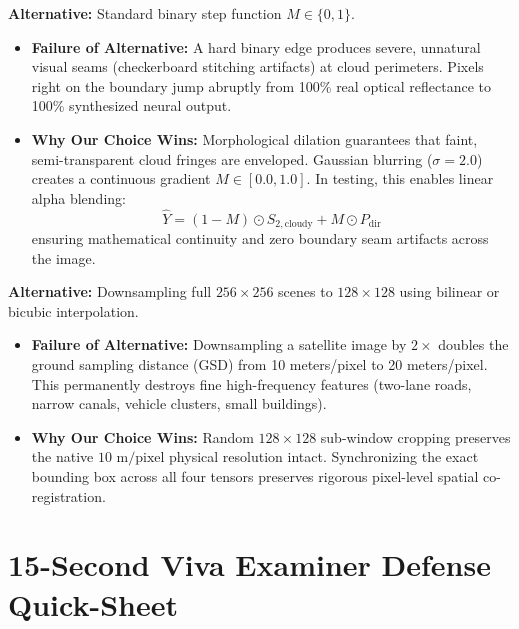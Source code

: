 \documentclass[11pt,a4paper]{article}
\begin{document}
\begin{tcolorbox}[colback=white,colframe=secondary,title=\textbf{4. Why a 3-Step Continuous Soft Mask instead of a Hard Binary 0/1 Mask?}]
\textbf{Alternative:} Standard binary step function $M \in \{0, 1\}$.
\begin{itemize}[leftmargin=1.2em, itemsep=0.2em]
    \item \textbf{Failure of Alternative:} A hard binary edge produces severe, unnatural visual seams (checkerboard stitching artifacts) at cloud perimeters. Pixels right on the boundary jump abruptly from 100\% real optical reflectance to 100\% synthesized neural output.
    \item \textbf{Why Our Choice Wins:} Morphological dilation guarantees that faint, semi-transparent cloud fringes are enveloped. Gaussian blurring ($\sigma=2.0$) creates a continuous gradient $M \in [0.0, 1.0]$. In testing, this enables linear alpha blending:
    \begin{equation}
    \hat{Y} = (1 - M) \odot S_{2,\text{cloudy}} + M \odot P_{\text{dir}}
    \end{equation}
    ensuring mathematical continuity and zero boundary seam artifacts across the image.
\end{itemize}
\end{tcolorbox}

\begin{tcolorbox}[colback=white,colframe=primary,title=\textbf{5. Why Shared Synchronized Spatial Cropping instead of Bilinear Downsampling?}]
\textbf{Alternative:} Downsampling full $256 \times 256$ scenes to $128 \times 128$ using bilinear or bicubic interpolation.
\begin{itemize}[leftmargin=1.2em, itemsep=0.2em]
    \item \textbf{Failure of Alternative:} Downsampling a satellite image by $2\times$ doubles the ground sampling distance (GSD) from 10 meters/pixel to 20 meters/pixel. This permanently destroys fine high-frequency features (two-lane roads, narrow canals, vehicle clusters, small buildings).
    \item \textbf{Why Our Choice Wins:} Random $128 \times 128$ sub-window cropping preserves the native $10\text{ m/pixel}$ physical resolution intact. Synchronizing the exact bounding box across all four tensors preserves rigorous pixel-level spatial co-registration.
\end{itemize}
\end{tcolorbox}

\section{15-Second Viva Examiner Defense Quick-Sheet}
\end{document}
